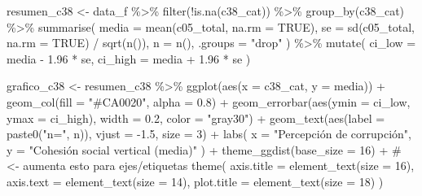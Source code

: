 \documentclass[
  spanish,
  a4paper,
  oneside]{scrbook}
\newenvironment{Shaded}{\begin{snugshade}}{\end{snugshade}}
\newcommand{\AttributeTok}[1]{\textcolor[rgb]{0.40,0.45,0.13}{#1}}
\newcommand{\CommentTok}[1]{\textcolor[rgb]{0.37,0.37,0.37}{#1}}
\newcommand{\ConstantTok}[1]{\textcolor[rgb]{0.56,0.35,0.01}{#1}}
\newcommand{\DecValTok}[1]{\textcolor[rgb]{0.68,0.00,0.00}{#1}}
\newcommand{\FloatTok}[1]{\textcolor[rgb]{0.68,0.00,0.00}{#1}}
\newcommand{\FunctionTok}[1]{\textcolor[rgb]{0.28,0.35,0.67}{#1}}
\newcommand{\NormalTok}[1]{\textcolor[rgb]{0.00,0.23,0.31}{#1}}
\newcommand{\OtherTok}[1]{\textcolor[rgb]{0.00,0.23,0.31}{#1}}
\newcommand{\SpecialCharTok}[1]{\textcolor[rgb]{0.37,0.37,0.37}{#1}}
\newcommand{\StringTok}[1]{\textcolor[rgb]{0.13,0.47,0.30}{#1}}
\begin{document}
\begin{Shaded}
\begin{Highlighting}[]
\NormalTok{resumen\_c38 }\OtherTok{\textless{}{-}}\NormalTok{ data\_f }\SpecialCharTok{\%\textgreater{}\%}
  \FunctionTok{filter}\NormalTok{(}\SpecialCharTok{!}\FunctionTok{is.na}\NormalTok{(c38\_cat)) }\SpecialCharTok{\%\textgreater{}\%}
  \FunctionTok{group\_by}\NormalTok{(c38\_cat) }\SpecialCharTok{\%\textgreater{}\%}
  \FunctionTok{summarise}\NormalTok{(}
    \AttributeTok{media   =} \FunctionTok{mean}\NormalTok{(c05\_total, }\AttributeTok{na.rm =} \ConstantTok{TRUE}\NormalTok{),}
    \AttributeTok{se      =} \FunctionTok{sd}\NormalTok{(c05\_total, }\AttributeTok{na.rm =} \ConstantTok{TRUE}\NormalTok{) }\SpecialCharTok{/} \FunctionTok{sqrt}\NormalTok{(}\FunctionTok{n}\NormalTok{()),}
    \AttributeTok{n       =} \FunctionTok{n}\NormalTok{(),}
    \AttributeTok{.groups =} \StringTok{"drop"}
\NormalTok{  ) }\SpecialCharTok{\%\textgreater{}\%}
  \FunctionTok{mutate}\NormalTok{(}
    \AttributeTok{ci\_low  =}\NormalTok{ media }\SpecialCharTok{{-}} \FloatTok{1.96} \SpecialCharTok{*}\NormalTok{ se,}
    \AttributeTok{ci\_high =}\NormalTok{ media }\SpecialCharTok{+} \FloatTok{1.96} \SpecialCharTok{*}\NormalTok{ se}
\NormalTok{  )}

\NormalTok{grafico\_c38 }\OtherTok{\textless{}{-}}\NormalTok{ resumen\_c38 }\SpecialCharTok{\%\textgreater{}\%}
  \FunctionTok{ggplot}\NormalTok{(}\FunctionTok{aes}\NormalTok{(}\AttributeTok{x =}\NormalTok{ c38\_cat, }\AttributeTok{y =}\NormalTok{ media)) }\SpecialCharTok{+}
  \FunctionTok{geom\_col}\NormalTok{(}\AttributeTok{fill =} \StringTok{"\#CA0020"}\NormalTok{, }\AttributeTok{alpha =} \FloatTok{0.8}\NormalTok{) }\SpecialCharTok{+}
  \FunctionTok{geom\_errorbar}\NormalTok{(}\FunctionTok{aes}\NormalTok{(}\AttributeTok{ymin =}\NormalTok{ ci\_low, }\AttributeTok{ymax =}\NormalTok{ ci\_high),}
                \AttributeTok{width =} \FloatTok{0.2}\NormalTok{, }\AttributeTok{color =} \StringTok{"gray30"}\NormalTok{) }\SpecialCharTok{+}
  \FunctionTok{geom\_text}\NormalTok{(}\FunctionTok{aes}\NormalTok{(}\AttributeTok{label =} \FunctionTok{paste0}\NormalTok{(}\StringTok{"n="}\NormalTok{, n)), }\AttributeTok{vjust =} \SpecialCharTok{{-}}\FloatTok{1.5}\NormalTok{, }\AttributeTok{size =} \DecValTok{3}\NormalTok{) }\SpecialCharTok{+}
  \FunctionTok{labs}\NormalTok{(}
    \AttributeTok{x =} \StringTok{"Percepción de corrupción"}\NormalTok{,}
    \AttributeTok{y =} \StringTok{"Cohesión social vertical (media)"}
\NormalTok{  ) }\SpecialCharTok{+}
  \FunctionTok{theme\_ggdist}\NormalTok{(}\AttributeTok{base\_size =} \DecValTok{16}\NormalTok{) }\SpecialCharTok{+}                                     \CommentTok{\# \textless{}{-} aumenta esto para ejes/etiquetas}
  \FunctionTok{theme}\NormalTok{(}
    \AttributeTok{axis.title =} \FunctionTok{element\_text}\NormalTok{(}\AttributeTok{size =} \DecValTok{16}\NormalTok{),}
    \AttributeTok{axis.text  =} \FunctionTok{element\_text}\NormalTok{(}\AttributeTok{size =} \DecValTok{14}\NormalTok{),}
    \AttributeTok{plot.title =} \FunctionTok{element\_text}\NormalTok{(}\AttributeTok{size =} \DecValTok{18}\NormalTok{)}
\NormalTok{  )}



\end{Highlighting}
\end{Shaded}
\end{document}

